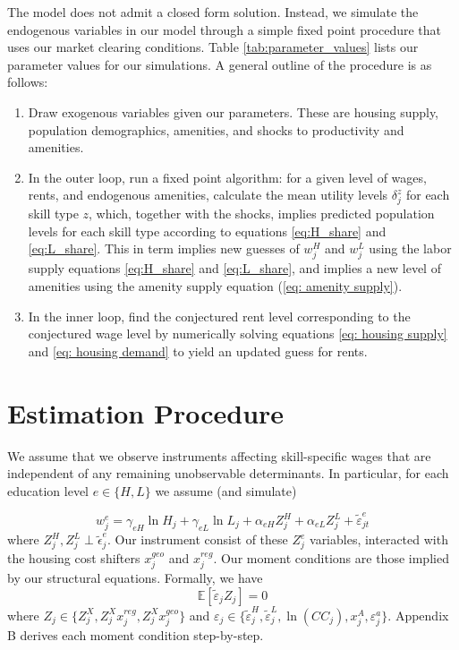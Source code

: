 \documentclass{article}
\begin{document}
The model does not admit a closed form solution. Instead, we simulate the endogenous variables in our model through a simple fixed point procedure that uses our market clearing conditions. Table \ref{tab:parameter_values} lists our parameter values for our simulations. A general outline of the procedure is as follows: 
\begin{enumerate}
\item Draw exogenous variables given our parameters. These are housing supply, population demographics, amenities, and shocks to productivity and amenities. 
\item In the outer loop, run a fixed point algorithm: for a given level of wages, rents, and endogenous amenities, calculate the mean utility levels $\delta^z_{j}$ for each skill type $z$, which, together with the shocks, implies predicted population levels for each skill type according to equations \ref{eq:H_share} and \ref{eq:L_share}. This in term implies new guesses of $w^H_{j}$ and $w^L_{j}$ using the labor supply equations \ref{eq:H_share} and \ref{eq:L_share}, and implies a new level of amenities using the amenity supply equation (\ref{eq: amenity supply}).

\item In the inner loop, find the conjectured rent level corresponding to the conjectured wage level by numerically solving equations \ref{eq: housing supply} and \ref{eq: housing demand} to yield an updated guess for rents. 
\end{enumerate}



\section{Estimation Procedure}
We assume that we observe instruments affecting skill-specific wages that are independent of any remaining unobservable determinants. In particular, for each education level $e\in \{H,L\} $ we assume (and simulate)

 $$ w_{j}^e = \gamma_{eH}  \ln H_{j} + \gamma_{eL} \ln L_{j}+\alpha_{eH} Z_{j}^H  + \alpha_{eL} Z_{j}^L + \tilde{\varepsilon}_{jt}^e
 $$
where $Z_j^H,Z_j^L \perp \tilde{\epsilon}_j^e$. Our instrument consist of these $Z^e_j$ variables, interacted with the housing cost shifters $x_j^{geo}$ and $x_j^{reg}$. Our moment conditions are those implied by our structural equations. Formally, we have
$$\mathbb{E}[\tilde\varepsilon_j  Z_j]=0$$ 
where $Z_j \in \{ Z^X_{j},  Z_{j}^X x_j^{reg},  Z_{j}^X x_j^{geo}\}$  and $\varepsilon_j \in \{ \tilde\varepsilon_j^H, \tilde\varepsilon_j^L, \ln (CC_j), x_j^A, \varepsilon_j^a\}$. Appendix B derives each moment condition step-by-step. 
\end{document}
